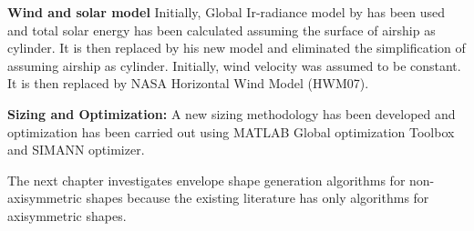 \textbf{Wind and solar model}
Initially, Global Ir-radiance model by \cite{Ran2007} has been used and total solar energy has been calculated assuming the surface of airship as cylinder. It is then replaced by his new model and eliminated the simplification of assuming airship as cylinder. Initially, wind velocity was assumed to be constant. It is then replaced by NASA Horizontal Wind Model (HWM07).

\textbf{Sizing and Optimization:} 
A new sizing methodology has been developed \cite{alam2014mdo} and optimization has been carried out using MATLAB Global optimization Toolbox and SIMANN optimizer.

The next chapter investigates envelope shape generation algorithms for non-axisymmetric shapes because the existing literature has only algorithms for axisymmetric shapes. 





